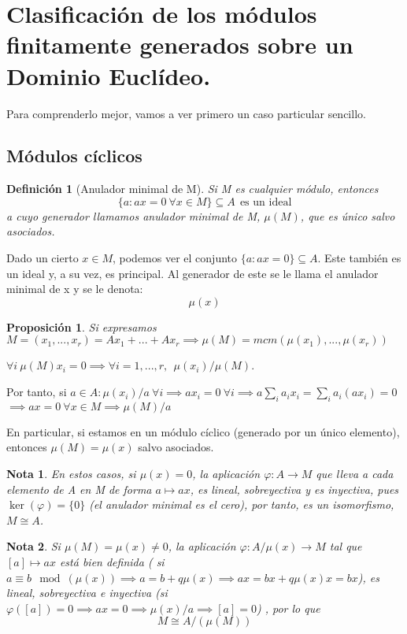 \documentclass[11pt, a4paper, titlepage]{article}
\makeatletter
\newif\IfInSansMode
\let\oldsf\sffamily
\renewcommand*{\sffamily}{\oldsf\mathversion{sans}\InSansModetrue}
\let\oldnorm\normalfont
\renewcommand*{\normalfont}{\oldnorm\InSansModefalse\mathversion{normal}}
\renewenvironment{proof}[1][\proofname] {\vspace{-15pt}\par\pushQED{\qed}\normalfont\topsep6\p@\@plus6\p@\relax\trivlist\item[\hskip\labelsep\it#1\@addpunct{.}]\ignorespaces}{\popQED\endtrivlist\@endpefalse}
\renewenvironment{proof}[1][\proofname] {\par\pushQED{\qed}\normalfont\topsep6\p@\@plus6\p@\relax\trivlist\item[\hskip\labelsep\itshape\sffamily#1\@addpunct{.}]\ignorespaces}{\popQED\endtrivlist\@endpefalse}
\theoremstyle{theorem-style}
\newtheorem{nprop}{Proposición}[section]
\theoremstyle{definition-style}
\newtheorem{ndef}{Definición}[section]
\theoremstyle{remark-style}
\newtheorem*{nota}{Nota}
\theoremstyle{example-style}
\makeatother
\begin{document}
\section{Clasificación de los módulos finitamente generados sobre un Dominio Euclídeo.}

Para comprenderlo mejor, vamos a ver primero un caso particular sencillo.
\subsection{Módulos cíclicos}
\begin{ndef}[Anulador minimal de M]
	Si M es cualquier módulo, entonces
	\[
	\{a: ax = 0 \ \forall x \in M\}\subseteq A \ \  \text{es un ideal}
	\]
	a cuyo generador llamamos anulador minimal de M, $\mu(M)$, que es único salvo asociados.
\end{ndef}

Dado un cierto $x\in M$, podemos ver el conjunto $\{a : ax = 0\} \subseteq A$. Este también es un ideal y, a su vez, es principal. Al generador de este se le llama el anulador minimal de x y se le denota:
\[
\mu(x)
\]

\begin{nprop}
	Si expresamos $M= (x_1,...,x_r) = Ax_1 + ...+ Ax_r \implies \mu(M) = mcm(\mu(x_1),...,\mu(x_r))$
\end{nprop}
\begin{proof}
	$\forall i \ \mu(M)x_i = 0 \implies \forall i=1,...,r, \ \ \mu(x_i) / \mu(M)$.

	Por tanto, si $a\in A: \mu(x_i)/a \ \forall i \implies ax_i = 0 \ \forall i \implies a\sum_i a_ix_i = \sum_i a_i(ax_i) = 0$
	$\implies ax = 0 \ \forall x \in M \implies \mu(M) / a$
\end{proof}

En particular, si estamos en un módulo cíclico (generado por un único elemento), entonces $\mu(M) = \mu(x)$ salvo asociados.

\begin{nota}
	En estos casos, si $\mu(x) = 0$, la aplicación $\varphi: A \to M$ que lleva a cada elemento de A en M de forma $a \mapsto ax$, es lineal, sobreyectiva y es inyectiva, pues $\ker(\varphi) = \{0\}$ (el anulador minimal es el cero), por tanto, es un isomorfismo, $M \cong A$.
\end{nota}

\begin{nota}
	Si $\mu(M) = \mu(x) \ne 0$, la aplicación $\varphi :A/\mu(x) \to M$ tal que $[a]\mapsto ax$ está bien definida ( si $a \equiv b \mod(\mu(x)) \implies a = b+q\mu(x) \implies ax = bx +q\mu(x)x = bx$), es lineal, sobreyectiva e inyectiva (si $\varphi([a]) = 0 \implies ax = 0 \implies  \mu(x)/a \implies [a] = 0$) , por lo que
	\[
	M  \cong A/(\mu(M))
	\]
\end{nota}
\end{document}
